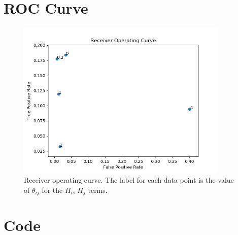\documentclass[a4paper]{article}
\begin{document}
\section{ROC Curve}
\begin{figure}[H]
\centering
\includegraphics[width=0.9\textwidth]{roc.png}
\caption{\label{fig:data}Receiver operating curve. The label for each data point is the value of $\theta_{ij}$ for the $H_i$, $H_j$ terms.}
\end{figure}

\section{Code}
\end{document}
